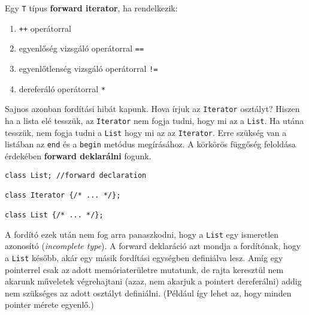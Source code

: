 \documentclass[../cpp_book/cpp_book.tex]{subfiles}
\begin{document}
	Egy \texttt{T} típus \textbf{forward iterator}, ha rendelkezik:
	\begin{enumerate}
		\item \texttt{++} operátorral
		\item egyenlőség vizsgáló operátorral \texttt{==}
		\item egyenlőtlenség vizsgáló operátorral \texttt{!=}
		\item dereferáló operátorral \texttt{*}
	\end{enumerate}
	Sajnos azonban fordítási hibát kapunk. Hova írjuk az \texttt{Iterator} osztályt? Hiszen ha a lista elé tesszük, az \texttt{Iterator} nem fogja tudni, hogy mi az a \texttt{List}. Ha utána tesszük, nem fogja tudni a \texttt{List} hogy mi az az \texttt{Iterator}. Erre szükség van a listában az \texttt{end} és a \texttt{begin} metódus megírásához. A körkörös függőség feloldása érdekében \textbf{forward deklarálni} fogunk. 
	\begin{lstlisting}
class List; //forward declaration

class Iterator {/* ... */};

class List {/* ... */};
	\end{lstlisting}
	A fordító ezek után nem fog arra panaszkodni, hogy a \texttt{List} egy ismeretlen azonosító (\textit{incomplete type}). A forward deklaráció azt mondja a fordítónak, hogy a \texttt{List} később, akár egy másik fordítási egységben definiálva lesz. Amíg egy pointerrel csak az adott memóriaterületre mutatunk, de rajta keresztül nem akarunk műveletek végrehajtani (azaz, nem akarjuk a pointert dereferálni) addig nem szükséges az adott osztályt definiálni. (Például így lehet az, hogy minden pointer mérete egyenlő.)
	
\end{document}
